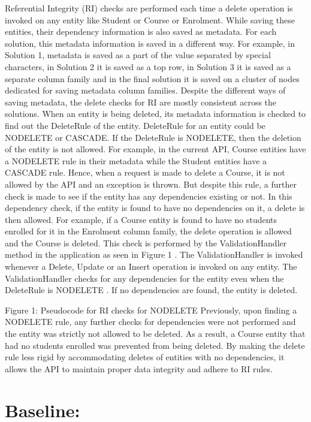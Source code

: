 Referential Integrity (RI) checks are performed each time a delete
operation is invoked on any entity like Student or Course or Enrolment. While
saving these entities, their dependency information is also saved as metadata.
For each solution, this metadata information is saved in a different way. For
example, in Solution 1, metadata is saved as a part of the value separated by
special characters, in Solution 2 it is saved as a top row, in Solution 3 it is
saved as a separate column family and in the final solution it is saved on a
cluster of nodes dedicated for saving metadata column families. Despite the
different ways of saving metadata, the delete checks for RI are mostly
consistent across the solutions.
When an entity is being deleted, its metadata information is checked to find out
the DeleteRule of the entity. DeleteRule for an entity could be NODELETE or
CASCADE. If the DeleteRule is NODELETE, then the deletion of the entity is not
allowed. For example, in the current API, Course entities have a NODELETE rule
in their metadata while the Student entities have a CASCADE rule. Hence, when a
request is made to delete a Course, it is not allowed by the API and an
exception is thrown. But despite this rule, a further check is made to see if
the entity has any dependencies existing or not. In this dependency check, if
the entity is found to have no dependencies on it, a delete is then allowed.
For example, if a Course entity is found to have no students enrolled for it in
the Enrolment column family, the delete operation is allowed and the Course is
deleted.
This check is performed by the ValidationHandler method in the application as
seen in Figure 1 . The ValidationHandler is invoked whenever a Delete, Update or
an Insert operation is invoked on any entity. The ValidationHandler checks for
any dependencies for the entity even when the DeleteRule  is NODELETE . If no
dependencies are found, the entity is deleted.

Figure 1: Pseudocode for RI checks for NODELETE Previously, upon finding a
NODELETE rule, any further checks for dependencies were not performed and the
entity was strictly not allowed to be deleted. As a result, a Course entity that
had no students enrolled was prevented from being deleted.
By making the delete rule less rigid by accommodating deletes of entities with
no dependencies, it allows the API to maintain proper data integrity and adhere
to RI rules.



\section{Baseline:  }\label{s:baseline}


